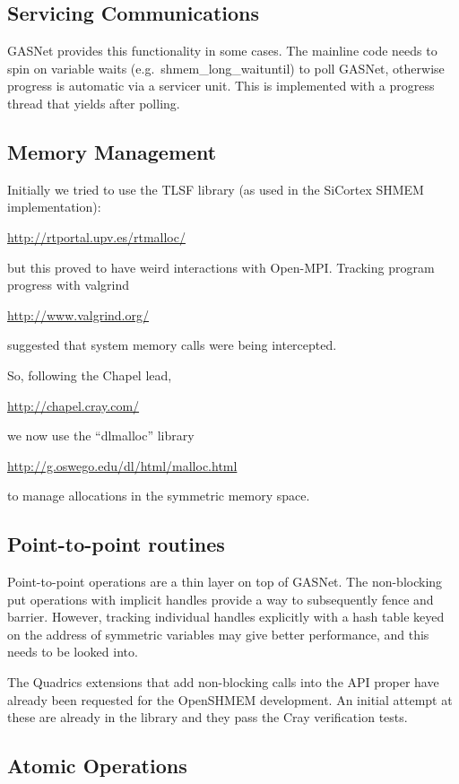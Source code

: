 \documentclass[english]{article}
\begin{document}
\subsection{Servicing Communications}

GASNet provides this functionality in some cases. The mainline code
needs to spin on variable waits (e.g.\ shmem\_long\_waituntil) to poll
GASNet, otherwise progress is automatic via a servicer unit.  This is
implemented with a progress thread that yields after polling.

\subsection{Memory Management}

Initially we tried to use the TLSF library (as used in the SiCortex
SHMEM implementation):

\url{http://rtportal.upv.es/rtmalloc/}

but this proved to have weird interactions with Open-MPI. Tracking
program progress with valgrind

\url{http://www.valgrind.org/}

suggested that system memory calls were
being intercepted.

So, following the Chapel lead,

\url{http://chapel.cray.com/}

we now use the ``dlmalloc'' library

\url{http://g.oswego.edu/dl/html/malloc.html}

to manage allocations in the symmetric memory space.

\subsection{Point-to-point routines}

Point-to-point operations are a thin layer on top of GASNet. The
non-blocking put operations with implicit handles provide a way to
subsequently fence and barrier. However, tracking individual handles
explicitly with a hash table keyed on the address of symmetric
variables may give better performance, and this needs to be looked
into.

The Quadrics extensions that add non-blocking calls into the API
proper have already been requested for the OpenSHMEM development. An
initial attempt at these are already in the library and they pass the
Cray verification tests.

\subsection{Atomic Operations}
\end{document}
